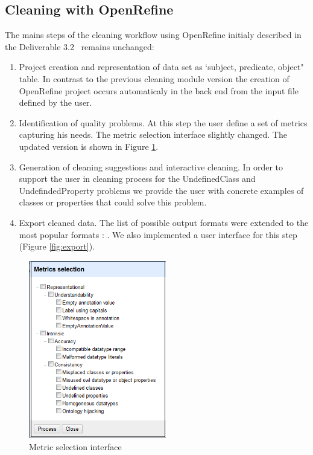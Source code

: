 \subsection{Cleaning with OpenRefine}
\label{sec:openrefine}

The mains steps of the cleaning workflow using OpenRefine initialy described in the Deliverable 3.2~\cite{d3.2} remains unchanged:
\begin{enumerate}
\item Project creation and representation of data set as `subject, predicate, object" table. In contrast to the previous cleaning module version the creation of OpenRefine project
occurs automaticaly in the back end from the input file defined by the user. 
\item Identification of quality problems. At this step the user define a set of metrics capturing his needs. The metric selection interface slightly changed. The updated version is shown in Figure \ref{fig:metric_selection}.
\item Generation of cleaning suggestions and interactive cleaning. In order to support the user in cleaning process for the UndefinedClass and UndefindedProperty problems we provide the user with concrete examples of classes or properties that could solve this problem. 
\item Export cleaned data. The list of possible output formats were extended to the most popular formats :  . We also implemented a user interface for this step (Figure \ref{fig:export}).
\end{enumerate}




\begin{figure}[ht!]
\centering
\includegraphics[width=6cm]{figures/MetricSelection.png}
\caption{Metric selection interface}
\label{fig:metric_selection}
\end{figure}



